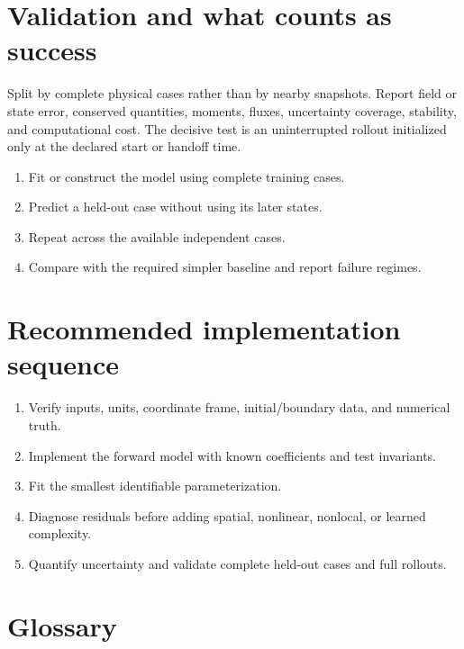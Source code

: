 \documentclass[11pt]{article}
\begin{document}
\section{Validation and what counts as success}

Split by complete physical cases rather than by nearby snapshots. Report field or state error, conserved quantities, moments, fluxes, uncertainty coverage, stability, and computational cost. The decisive test is an uninterrupted rollout initialized only at the declared start or handoff time.

\begin{enumerate}[leftmargin=*]
 \item Fit or construct the model using complete training cases.
 \item Predict a held-out case without using its later states.
 \item Repeat across the available independent cases.
 \item Compare with the required simpler baseline and report failure regimes.
\end{enumerate}

\section{Recommended implementation sequence}

\begin{enumerate}[leftmargin=*]
 \item Verify inputs, units, coordinate frame, initial/boundary data, and numerical truth.
 \item Implement the forward model with known coefficients and test invariants.
 \item Fit the smallest identifiable parameterization.
 \item Diagnose residuals before adding spatial, nonlinear, nonlocal, or learned complexity.
 \item Quantify uncertainty and validate complete held-out cases and full rollouts.
\end{enumerate}

\section{Glossary}
\end{document}
